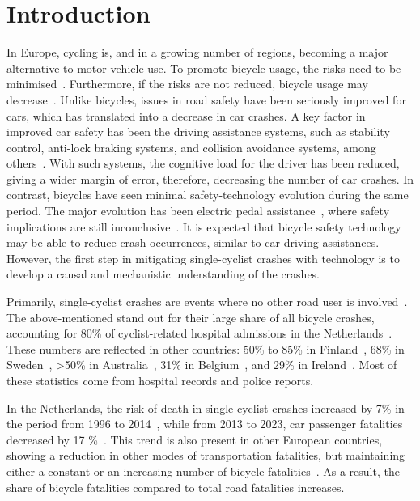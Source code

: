 \documentclass{article}
\begin{document}
\section{Introduction} \label{sec: introduction}
% 
In Europe, cycling is, and in a growing number of regions, becoming a major alternative to motor vehicle use.
%
To promote bicycle usage, the risks need to be minimised~\cite{Eur24}.
%
Furthermore, if the risks are not reduced, bicycle usage may decrease~\cite{Gu19}.
%
Unlike bicycles, issues in road safety have been seriously improved for cars, which has translated into a decrease in car crashes.
%
A key factor in improved car safety has been the driving assistance systems, such as stability control, anti-lock braking systems, and collision avoidance systems, among others~\cite{Ben14}.
%
With such systems, the cognitive load for the driver has been reduced, giving a wider margin of error, therefore, decreasing the number of car crashes.
%
In contrast, bicycles have seen minimal safety-technology evolution during the same period.
%
The major evolution has been electric pedal assistance~\cite{Kap22}, where safety implications are still inconclusive~\cite{Bai13, Hau16, Sch18a, Sch20}.
%
It is expected that bicycle safety technology may be able to reduce crash occurrences, similar to car driving assistances. 
%
However, the first step in mitigating single-cyclist crashes with technology is to develop a causal and mechanistic understanding of the crashes.


Primarily, single-cyclist crashes are events where no other road user is involved~\cite{Weg24}.
%
The above-mentioned stand out for their large share of all bicycle crashes, accounting for 80\% of cyclist-related hospital admissions in the Netherlands~\cite{Boe17}.
%
These numbers are reflected in other countries: 50\% to 85\% in Finland~\cite{Utr23}, 68\% in Sweden~\cite{Ohl19}, \textgreater50\% in Australia~\cite{Bou13}, 31\% in Belgium~\cite{Van16}, and 29\% in Ireland~\cite{Gil21a}.
%
Most of these statistics come from hospital records and police reports.


In the Netherlands, the risk of death in single-cyclist crashes increased by 7\% in the period from 1996 to 2014~\cite{Sch17}, while from 2013 to 2023, car passenger fatalities decreased by 17 \%~\cite{Cen24, Sti25}.
%
This trend is also present in other European countries, showing a reduction in other modes of transportation fatalities, but maintaining either a constant or an increasing number of bicycle fatalities~\cite{Eur24}.
%
As a result, the share of bicycle fatalities compared to total road fatalities increases.
\end{document}
